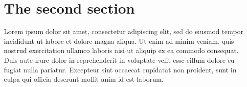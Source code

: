 \documentclass[12pt,letterpaper]{article}
\begin{document}
\section{The second section}

Lorem ipsum dolor sit amet, consectetur adipiscing elit, sed do eiusmod tempor incididunt ut labore et dolore magna aliqua. Ut enim ad minim veniam, quis nostrud exercitation ullamco laboris nisi ut aliquip ex ea commodo consequat. Duis aute irure dolor in reprehenderit in voluptate velit esse cillum dolore eu fugiat nulla pariatur. Excepteur sint occaecat cupidatat non proident, sunt in culpa qui officia deserunt mollit anim id est laborum.
\end{document}
